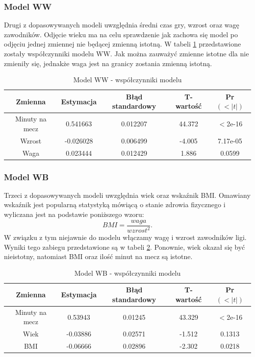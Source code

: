 \documentclass[11pt,a4paper]{article}
\begin{document}
\subsubsection{Model WW}
Drugi z dopasowywanych modeli uwzględnia średni czas gry, wzrost oraz wagę zawodników. Odjęcie wieku ma na celu sprawdzenie jak zachowa się model po odjęciu jednej zmiennej nie będącej zmienną istotną. W tabeli \ref{model_ww} przedstawione zostały współczynniki modelu WW. Jak można zauważyć zmienne istotne dla nie zmieniły się, jednakże waga jest na granicy zostania zmienną istotną.

\begin{table}[H]
	\begin{tabular}{| c | c | c | c | c |}
		\hline
		Zmienna & Estymacja & Błąd standardowy & T-wartość & Pr$(<|t|)$\\ \hline
		Minuty na mecz & 0.541663 & 0.012207 & 44.372 & $<$2e-16\\ \hline
		Wzrost & -0.026028 & 0.006499 & -4.005 & 7.17e-05 \\ \hline 
		Waga & 0.023444 & 0.012429 & 1.886 & 0.0599 \\ \hline
	\end{tabular}
	\caption{Model WW - współczynniki modelu}
	\label{model_ww}
\end{table}

\subsubsection{Model WB}
Trzeci z dopasowywanych modeli uwzględnia wiek oraz wskaźnik BMI. Omawiany wskaźnik jest popularną statystyką mówiącą o stanie zdrowia fizycznego i wyliczana jest na podstawie poniższego wzoru:
\begin{equation}
BMI = \frac{waga}{wzrost^2}.
\end{equation}
W związku z tym niejawnie do modelu włączamy wagę i wzrost zawodników ligi. Wyniki tego zabiegu przedstawione są w tabeli \ref{model_wb}. Ponownie, wiek okazał się być nieistotny, natomiast BMI oraz ilość minut na mecz są istotne.
\begin{table}[H]
	\begin{tabular}{| c | c | c | c | c |}
		\hline
		Zmienna & Estymacja & Błąd standardowy & T-wartość & Pr$(<|t|)$\\ \hline
		Minuty na mecz & 0.53943 & 0.01245 & 43.329 & $<$2e-16\\ \hline
		Wiek & -0.03886 & 0.02571 & -1.512 & 0.1313\\ \hline 
		BMI & -0.06666 & 0.02896 & -2.302 &  0.0218\\ \hline 	
	\end{tabular}
	\caption{Model WB - współczynniki modelu}
	\label{model_wb}
\end{table}
\end{document}
